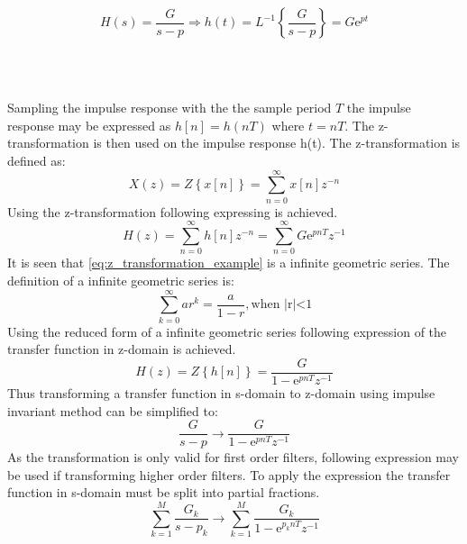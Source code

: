\begin{equation}
H(s) = \frac{G}{s-p} \Rightarrow h(t) = L^{-1}\left\lbrace \frac{G}{s-p} \right\rbrace = G\text{e}^{pt}
\end{equation}
\begin{where}
\\
\\
\end{where}

Sampling the impulse response with the the sample period $T$ the impulse response may be expressed as $h[n] = h(nT)$ where $t = nT$. The z-transformation is then used on the impulse response h(t). The z-transformation is defined as:
\begin{equation}
X(z) = Z \left\lbrace x[n] \right\rbrace = \sum_{n=0}^{\infty}x[n]z^{-n}
\end{equation}
Using the z-transformation following expressing is achieved.
\begin{equation} \label{eq:z_transformation_example}
H(z) = \sum_{n=0}^{\infty}h[n]z^{-n} = \sum_{n=0}^{\infty}G\text{e}^{pnT}z^{-1}
\end{equation}
It is seen that \autoref{eq:z_transformation_example} is a infinite geometric series. The definition of a infinite geometric series is:
\begin{equation} \label{eq:z_transformation_example}
\sum_{k=0}^{\infty}ar^k  = \frac{a}{1-r}, \text{when |r|<1}
\end{equation}
Using the reduced form of a infinite geometric series following expression of the transfer function in z-domain is achieved.
\begin{equation} \label{eq:z_transformation_example1}
H(z) = Z \left\lbrace h[n] \right\rbrace = \frac{G}{1-\text{e}^{pnT}z^{-1}}
\end{equation}
Thus transforming a transfer function in s-domain to z-domain using impulse invariant method can be simplified to:
\begin{equation} \label{eq:z_transformation_example2}
\frac{G}{s-p} \rightarrow \frac{G}{1-\text{e}^{pnT}z^{-1}}
\end{equation}
As the transformation is only valid for first order filters, following expression may be used if transforming higher order filters. To apply the expression the transfer function in s-domain must be split into partial fractions.
\begin{equation} \label{eq:z_transformation_example3}
\sum_{k=1}^{M} \frac{G_k}{s-p_k} \rightarrow \sum_{k=1}^{M} \frac{G_k}{1-\text{e}^{p_knT}z^{-1}}
\end{equation}

